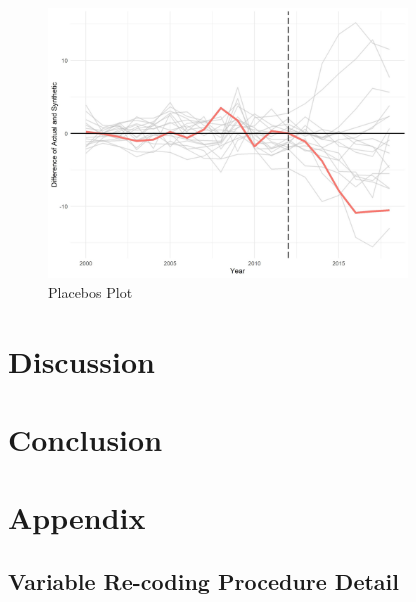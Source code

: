 \documentclass{article}
\begin{document}
\begin{figure}[H]
	\begin{center}
		\includegraphics[width=0.85\textwidth]{placebos_plot_colorado}
	\end{center}
	\caption{Placebos Plot}
	\label{fig:placebos_plot_colorado}
\end{figure}


\section{Discussion}

\section{Conclusion}

\section{Appendix}

\subsection{Variable Re-coding Procedure Detail}
\end{document}
